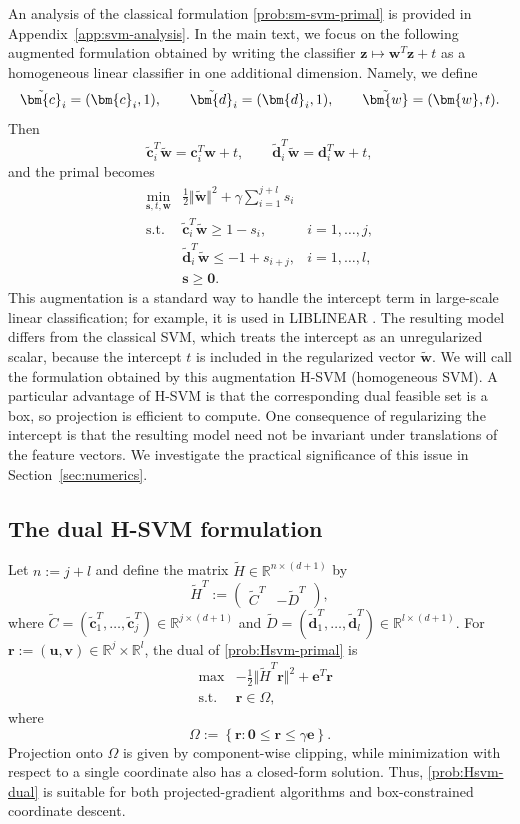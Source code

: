 \documentclass[twoside,11pt]{article}
\newcommand\bz{\bm{0}}
\renewcommand{\c}{\bm{c}}
\renewcommand{\d}{\bm{d}}
\newcommand{\R}{{\mathbb{R}}} %
\renewcommand\r{\bm{r}}
\newcommand\s{\bm{s}}
\renewcommand\u{\bm{u}}
\renewcommand\v{\bm{v}}
\newcommand\w{\bm{w}}
\newcommand\z{\bm{z}}
\newcommand\e{\bm{e}}
\newcommand\tw{\tilde{\w}}
\newcommand\tc{\tilde{\c}}
\newcommand\td{\tilde{\d}}
\newcommand\tH{\tilde{H}}
\newcommand\tC{\tilde{C}}
\newcommand\tD{\tilde{D}}
\begin{document}
An analysis of the classical formulation \eqref{prob:sm-svm-primal} is provided in Appendix~\ref{app:svm-analysis}. In the main text, we focus on the following augmented formulation obtained by writing the classifier $\z \mapsto \w^T\z + t$ as a homogeneous linear classifier in one additional dimension. Namely, we define
\[
    \tilde \c_i=(\c_i,1),\qquad \tilde \d_i=(\d_i,1),\qquad \tw=(\w,t).
\]
Then
\[
    \tc_i^T\tw = \c_i^T\w + t,\qquad \td_i^T\tw = \d_i^T\w + t,
\]
and the primal becomes
\begin{equation} \label{prob:Hsvm-primal}
  \begin{array}{rll}
  \min_{\s,t,\w}& \frac{1}{2}\Vert\tw\Vert^2+\gamma\sum_{i=1}^{j+l}s_i \\
  \mbox{s.t.} & \tc_i^T\tw\ge 1-s_i, &
  i=1,\ldots, j, \\
  &\td_i^T\tw\le -1 + s_{i+j}, &
  i=1,\ldots,l, \\
  &\s\ge\bz.
  \end{array}
\end{equation}
This augmentation is a standard way to handle the intercept term in large-scale linear classification; for example, it is used in LIBLINEAR \cite{LIBLINEAR}. The resulting model differs from the classical SVM, which treats the intercept as an unregularized scalar, because the intercept $t$ is included in the regularized vector $\tw$. We will call the formulation obtained by this augmentation H-SVM (homogeneous SVM). A particular advantage of H-SVM is that the corresponding dual feasible set is a box, so projection is efficient to compute. One consequence of regularizing the intercept is that the resulting model need not be invariant under translations of the feature vectors. We investigate the practical significance of this issue in Section~\ref{sec:numerics}.

\subsection{The dual H-SVM formulation} \label{sec:Hsvm-dual}
Let $n:=j+l$ and define the matrix $\tH \in \R^{n \times (d+1)}$ by
\[
    \tH^T := \begin{pmatrix}
        \tC^T & -\tD^T
    \end{pmatrix},
\]
where $\tC = (\tc_1^T,\hdots,\tc_j^T) \in \R^{j\times (d+1)}$ and $\tD = (\td_1^T,\hdots,\td_l^T) \in \R^{l \times (d+1)}$. For $\r:=(\u,\v)\in\R^j\times\R^l$, the dual of \eqref{prob:Hsvm-primal} is
\begin{equation} \label{prob:Hsvm-dual}
  \begin{array}{rrl}
    &\max & -\frac{1}{2}\Vert \tH^T\r\Vert^2 + \e^T\r\\
    &\mbox{s.t.}&\r\in \Omega,
  \end{array}
\end{equation}
where 
\[
    \Omega := \left\{ \r: \bz\leq\r\leq\gamma\e \right\}.
\]
Projection onto $\Omega$ is given by component-wise clipping, while minimization with respect to a single coordinate also has a closed-form solution. Thus, \eqref{prob:Hsvm-dual} is suitable for both projected-gradient algorithms and box-constrained coordinate descent.
\end{document}
